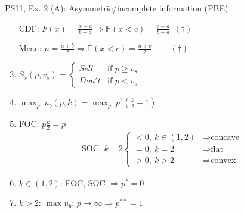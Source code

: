 \begin{frame}{PS11, Ex. 2 (A): Asymmetric/incomplete information (PBE)}
\begin{multicols}{2}
\begin{enumerate}
        \item[CDF:] \vspace{-2pt} $F(x)=\frac{x-a}{b-a}\Rightarrow\mathbb{P}(x<c)=\frac{c-a}{b-a}\ \ (\dagger)$
        \item[Mean:] \vspace{-2pt}  $\mu=\frac{a+b}{2}\Rightarrow\mathbb{E}(x<c)=\frac{a+c}{2}\quad\quad\ (\ddagger)$
        \item \vspace{-2pt} $S_s(p,v_s)=\left\{\begin{array}{ll}
          Sell  & \text{if }p\geq v_s \\
          Don't & \text{if }p < v_s
        \end{array}\right.$
        \item \vspace{-2pt} $\displaystyle{\max_p}\ u_b(p,k)=\displaystyle{\max_p}\ p^2\left(\frac{k}{2}-1\right)$
        \item \vspace{-2pt} FOC: $p\frac{k}{2}=p$\vspace{-6pt}
        \begin{align*}
          \text{SOC: }k-2\left\{\begin{array}{ll}
              <0,\ k\in(1,2)&\Rightarrow\text{concave}\\
              =0,\ k=2&\Rightarrow\text{flat}\\
              >0,\ k>2&\Rightarrow\text{convex}
          \end{array}\right.
        \end{align*}
        \item \vspace{-6pt} $k\in(1,2)$: FOC, SOC $\Rightarrow p^*=0$
        \item \vspace{-2pt} $k>2$: $\max u_b$: $p\rightarrow\infty\Rightarrow p^{**}=1$
      \end{enumerate}
      \vfill\null
    \end{multicols}
\end{frame}
